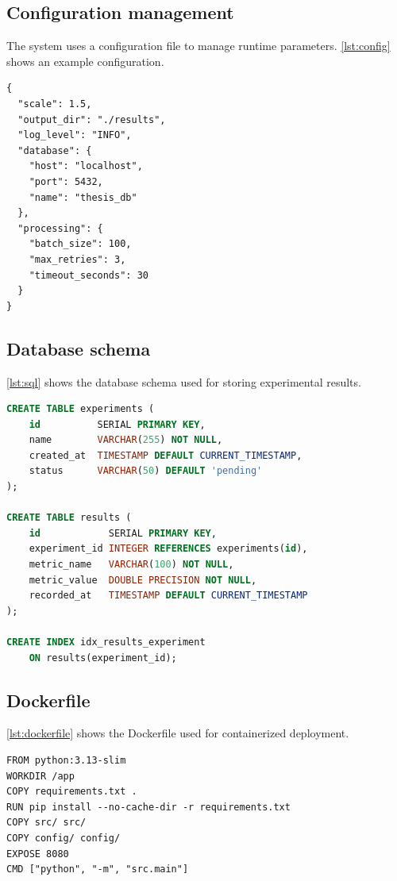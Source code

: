 \subsection{Configuration management}

The system uses a configuration file to manage runtime parameters.
\cref{lst:config} shows an example configuration.

\begin{lstlisting}[caption={Example configuration file (config.json)}, label={lst:config}]
{
  "scale": 1.5,
  "output_dir": "./results",
  "log_level": "INFO",
  "database": {
    "host": "localhost",
    "port": 5432,
    "name": "thesis_db"
  },
  "processing": {
    "batch_size": 100,
    "max_retries": 3,
    "timeout_seconds": 30
  }
}
\end{lstlisting}

\subsection{Database schema}

\cref{lst:sql} shows the database schema used for storing experimental results.

\begin{lstlisting}[language=SQL, caption={Database schema (schema.sql)}, label={lst:sql}]
CREATE TABLE experiments (
    id          SERIAL PRIMARY KEY,
    name        VARCHAR(255) NOT NULL,
    created_at  TIMESTAMP DEFAULT CURRENT_TIMESTAMP,
    status      VARCHAR(50) DEFAULT 'pending'
);

CREATE TABLE results (
    id            SERIAL PRIMARY KEY,
    experiment_id INTEGER REFERENCES experiments(id),
    metric_name   VARCHAR(100) NOT NULL,
    metric_value  DOUBLE PRECISION NOT NULL,
    recorded_at   TIMESTAMP DEFAULT CURRENT_TIMESTAMP
);

CREATE INDEX idx_results_experiment
    ON results(experiment_id);
\end{lstlisting}

\subsection{Dockerfile}

\cref{lst:dockerfile} shows the Dockerfile used for containerized deployment.

\begin{lstlisting}[caption={Application Dockerfile}, label={lst:dockerfile}]
FROM python:3.13-slim
WORKDIR /app
COPY requirements.txt .
RUN pip install --no-cache-dir -r requirements.txt
COPY src/ src/
COPY config/ config/
EXPOSE 8080
CMD ["python", "-m", "src.main"]
\end{lstlisting}

